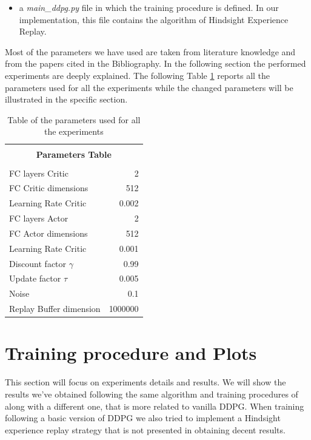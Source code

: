 \documentclass[a4paper]{report}
\begin{document}
\begin{itemize}
\item a \textit{main\_ddpg.py} file in which the training procedure is defined. In our implementation, this file contains the algorithm of Hindsight Experience Replay.

\end{itemize}

Most of the parameters we have used are taken from literature knowledge and from the papers cited in the Bibliography. In the following section the performed experiments are deeply explained. The following Table \ref{table} reports all the parameters used for all the experiments while the changed parameters will be illustrated in the specific section.
\\

\begin{table}[h]
\begin{center}
\begin{tabular}{|l|r|} 



\hline

\multicolumn{2}{|c|}{}\\
\multicolumn{2}{|c|}{\textbf{\Large            Parameters Table}}\\
\multicolumn{2}{|c|}{}\\

\hline

FC layers Critic 			& 2			\\
FC Critic dimensions		& 512		\\
Learning Rate Critic 		& 0.002		\\
FC layers Actor 			& 2			\\
FC Actor dimensions 		& 512		\\
Learning Rate Critic 		& 0.001		\\
Discount factor $\gamma$	& 0.99		\\
Update factor $\tau$		& 0.005		\\	%
Noise						& 0.1		\\
Replay Buffer dimension		& 1000000	\\

\hline
\end{tabular}
\end{center}
\caption{\label{table} Table of the parameters used for all the experiments}
\end{table}


\section{Training procedure and Plots}
This section will focus on experiments details and results. We will show the results we've obtained following the same algorithm and training procedures of \cite{her} along with a different one, that is more related to vanilla DDPG. When training following a basic version of DDPG  we also tried to implement a Hindsight experience replay strategy that is not presented in \cite{her} obtaining decent results.
\end{document}
